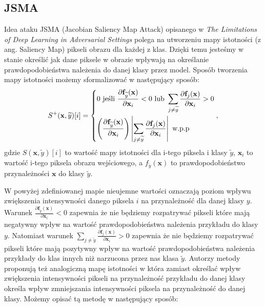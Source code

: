 \documentclass[
    left=2.5cm,         %
    right=2.5cm,        %
    top=2.5cm,          %
    bottom=3cm,         %
    bindingoffset=6mm,  %
    nohyphenation=false %
]{eiti/eiti-thesis}
\renewcommand{\vec}[1]{\mathbf{#1}}
\begin{document}
\subsection{JSMA}
Idea ataku JSMA (Jacobian Saliency Map Attack) opisanego w
\textit{The Limitations of Deep Learning in Adversarial Settings}\cite{DBLP:journals/corr/PapernotMJFCS15}
polega na utworzeniu mapy istotności (z ang. Saliency Map) pikseli obrazu dla każdej z klas.
Dzięki temu jesteśmy w stanie określić jak dane piksele w obrazie wpływają na określanie prawdopodobieństwa należenia
do danej klasy przez model. Sposób tworzenia mapy istotności możemy sformalizować w następujący sposób:
\begin{equation}\label{jsma+}
S^{+} ( \vec{ x }, \widetilde{y} ) [ i ] = \begin{dcases}
    { 0 \text { jeśli } \frac { \partial \mathbf {f} _ { \widetilde{y} } ( \mathbf {x} ) } { \partial \mathbf {x} _ { i } } < 0 \text { lub } \sum _ { j \neq \widetilde{y} } \frac { \partial \mathbf {f} _ { j } ( \mathbf {x} ) } { \partial \mathbf {x} _ { i } } > 0 } \\
    { \left( \frac { \partial \mathbf {f} _ { \widetilde{y} } ( \mathbf {x} ) } { \partial \mathbf {x} _ { i } } \right) \left| \sum _ { j \neq \widetilde{y} } \frac { \partial \mathbf {f} _ { j } ( \mathbf {x} ) } { \partial \mathbf {x} _ { i } } \right| \text { w.p.p } }
\end{dcases},
\end{equation}
gdzie \( S(\vec{x}, \widetilde{y})[i] \) to wartość mapy istotności dla i-tego piksela i klasy $\widetilde{y}$,
$\vec{x}_i$ to wartość i-tego piksela obrazu wejściowego, a
$f_{\widetilde{y}}(\vec{x})$ to prawdopodobieństwo przynależności $\vec{x}$ do klasy $\widetilde{y}$.

W powyżej zdefiniowanej mapie nieujemne wartości oznaczają poziom wpływu zwiększenia intensywności danego piksela $i$
na przynależność dla danej klasy $y$.
Warunek $\frac { \partial \mathbf {f} _ { \widetilde{y} } ( \mathbf {x} ) } { \partial \mathbf {x} _ { i } } < 0$
zapewnia że nie będziemy rozpatrywać pikseli które mają negatywny wpływ na wartość prawdopodobieństwa należenia przykładu
do klasy $y$.
Natomiast warunek $\sum _ { j \neq \widetilde{y} } \frac { \partial \mathbf {f} _ { j } ( \mathbf {x} ) } { \partial \mathbf {x} _ { i } } > 0 $
zapewnia że nie będziemy rozpatrywać pikseli które mają pozytywny wpływ na wartość prawdopodobieństwa należenia przykłady do klas
innych niż narzucona przez nas klasa $\widetilde{y}$. Autorzy metody proponują też analogiczną mapę istotności w która
zamiast określać wpływ zwiększenia intensywności pikseli na przynależność przykładu do danej klasy określa wpływ zmniejszania
intensywności piksela na przynależność do danej klasy. Możemy opisać tą metodę w następujący sposób:
\end{document}

